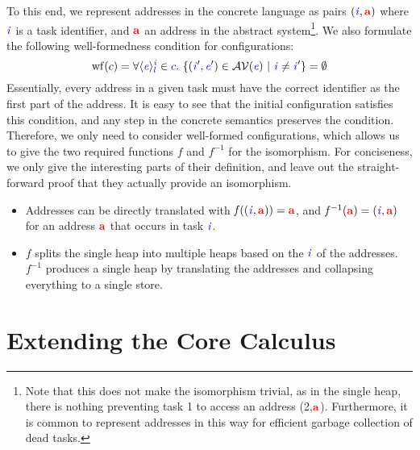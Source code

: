 \documentclass{llncs}
\newcommand{\Varid}[1]{\mathit{#1}}
\begin{document}
To this end, we represent addresses in the concrete language as
pairs $(\ensuremath{\ifc{\Varid{i}}},\ensuremath{\tar{a}})$ where \ensuremath{\ifc{\Varid{i}}} is a task identifier, and \ensuremath{\tar{a}} an
address in the abstract system\footnote{Note that this does
  not make the isomorphism trivial, as in the single heap, there
  is nothing preventing task 1 to access an address (2,\ensuremath{\tar{a}}).
  Furthermore, it is common to represent addresses in this way
  for efficient garbage collection of dead tasks.}.
We also formulate the following well-formedness condition for
configurations:
\[
  \ensuremath{\operatorname{wf}(c)} = \forall \ensuremath{\langle \ifc{\Varid{e}}\rangle^{\ifc{\Varid{i}}}_{\ifc{l}}} \in \ensuremath{\ifc{c}}.\ 
  \{ (\ensuremath{\ifc{\Varid{i}}'},\ensuremath{\ifc{\Varid{e}}'}) \in \mathcal{AV}(\ensuremath{\ifc{\Varid{e}}}) \ \vert\ \ensuremath{\ifc{\Varid{i}}} \neq \ensuremath{\ifc{\Varid{i}}'} \} = \emptyset
\]
Essentially, every address in a given task must have the correct
identifier as the first part of the address.  It is easy to
see that the initial configuration satisfies this condition, and
any step in the concrete semantics preserves the condition.
Therefore, we only need to consider well-formed configurations,
which allows us to give the two required functions
\ensuremath{\Varid{f}} and \ensuremath{\Varid{f}^{-1}} for the isomorphism.  For conciseness, we only give
the interesting parts of their definition,
and leave out the straight-forward proof that they
actually provide an isomorphism.
\begin{itemize}
  \item Addresses can be directly translated with
  $\ensuremath{\Varid{f}}((\ensuremath{\ifc{\Varid{i}}},\ensuremath{\tar{a}}))=\ensuremath{\tar{a}}$, and $\ensuremath{\Varid{f}^{-1}}(\ensuremath{\tar{a}})=\ensuremath{(\ifc{\Varid{i}},\tar{a})}$ for
  an address \ensuremath{\tar{a}} that occurs in task \ensuremath{\ifc{\Varid{i}}}.
  \item \ensuremath{\Varid{f}} splits the single heap into multiple heaps based on
  the \ensuremath{\ifc{\Varid{i}}} of the addresses.  \ensuremath{\Varid{f}^{-1}} produces a single heap
  by translating the addresses and collapsing everything to a single
  store.
\end{itemize}




\section{Extending the Core Calculus}
\label{sec:appendix-extensions}
\end{document}
